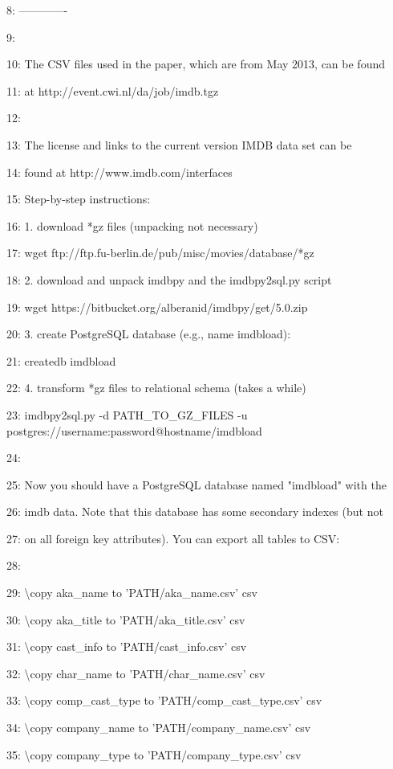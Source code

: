 \documentclass[11pt,a4paper]{article}
\begin{document}
8: -------------

9:

10: The CSV files used in the paper, which are from May 2013, can be found

11: at http://event.cwi.nl/da/job/imdb.tgz

12:

13: The license and links to the current version IMDB data set can be

14: found at http://www.imdb.com/interfaces

15: Step-by-step instructions:

16: 1. download *gz files (unpacking not necessary)

17:   wget ftp://ftp.fu-berlin.de/pub/misc/movies/database/*gz

18: 2. download and unpack imdbpy and the imdbpy2sql.py script

19:   wget https://bitbucket.org/alberanid/imdbpy/get/5.0.zip

20: 3. create PostgreSQL database (e.g., name imdbload):

21:   createdb imdbload

22: 4. transform *gz files to relational schema (takes a while)

23:   imdbpy2sql.py -d PATH\_TO\_GZ\_FILES -u postgres://username:password@hostname/imdbload

24:

25: Now you should have a PostgreSQL database named "imdbload" with the

26: imdb data. Note that this database has some secondary indexes (but not

27: on all foreign key attributes). You can export all tables to CSV:

28:

29: \textbackslash{}copy aka\_name to 'PATH/aka\_name.csv' csv

30: \textbackslash{}copy aka\_title to 'PATH/aka\_title.csv' csv

31: \textbackslash{}copy cast\_info to 'PATH/cast\_info.csv' csv

32: \textbackslash{}copy char\_name to 'PATH/char\_name.csv' csv

33: \textbackslash{}copy comp\_cast\_type to 'PATH/comp\_cast\_type.csv' csv

34: \textbackslash{}copy company\_name to 'PATH/company\_name.csv' csv

35: \textbackslash{}copy company\_type to 'PATH/company\_type.csv' csv
\end{document}
